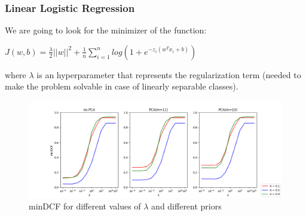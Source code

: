 \documentclass[10pt, a4paper, twocolumn]{article} %
\begin{document}
\subsubsection{Linear Logistic Regression}
We are going to look for the minimizer of the function:
\begin{center}
	\begin{math}
		J(w,b) = \frac{\lambda}{2}||w||^2 + \frac{1}{n}\sum_{i=1}^{n}log(1 + e^{-z_i(w^Tx_i+b)})
	\end{math}
\end{center}
where $\lambda$ is an hyperparameter that represents the regularization term (needed to make the 
problem solvable in case of linearly separable classes).
\begin{figure}[ht!]
	\includegraphics[width=\linewidth]{./Pictures/FeaturesAnalysis/dcfplotLLR.png}
	\caption{minDCF for different values of $\lambda$ and different priors}
	\label{dcfLLR} 
\end{figure}
\end{document}
